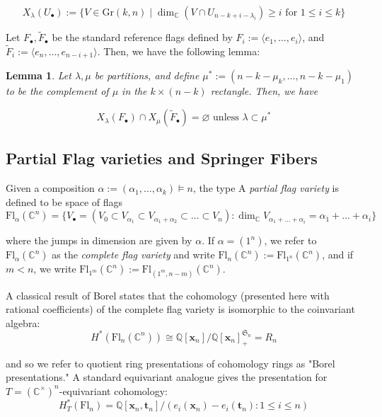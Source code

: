 \documentclass[11pt]{amsart}
\numberwithin{equation}{section}
\newtheorem{lemma}[theorem]{Lemma}
\theoremstyle{definition}
\newcommand{\symm}{{\mathfrak{S}}}
\newcommand{\Gr}{{\mathrm {Gr}}}
\newcommand{\CC}{{\mathbb{C}}}
\newcommand{\QQ}{{\mathbb{Q}}}
\newcommand{\xxx}{{\mathbf{x}}}
\newcommand{\ttt}{{\mathbf{t}}}
\newcommand{\Fl}{\text{Fl}}
\begin{document}
\[
X_\lambda(U_\bullet) := \{ V \in \Gr(k,n) \mid \dim_\CC(V \cap U_{n-k+i-\lambda_i}) \geq i \text{ for } 1 \leq i \leq k \}
\]

Let $F_\bullet, \widetilde{F}_\bullet$ be the standard reference flags defined by $F_i := \langle e_1,\dots,e_i \rangle$, and $\widetilde{F}_i := \langle e_n, \dots, e_{n-i+1} \rangle$. Then, we have the following lemma:

\begin{lemma}\label{lem: grass-intersect}
    Let $\lambda,\mu$ be partitions, and define $\mu^* := (n-k-\mu_k,\dots,n-k-\mu_1)$ to be the complement of $\mu$ in the $k \times (n-k)$ rectangle. Then, we have

    \[
X_\lambda(F_\bullet) \cap X_\mu(\widetilde{F}_\bullet) = \varnothing \text{ unless } \lambda \subset \mu^*
\]
\end{lemma}

\subsection{Partial Flag varieties and Springer Fibers}

Given a composition $\alpha := (\alpha_1,\dots,\alpha_k) \vDash n$, the type A \emph{partial flag variety} is defined to be space of flags
\[
\Fl_\alpha(\CC^n) = \{ V_\bullet = (V_0 \subset V_{\alpha_1} \subset V_{\alpha_1 + \alpha_2} \subset \dots \subset V_n) : \dim_\CC V_{\alpha_1 + \dots + \alpha_i} = \alpha_1 + \dots + \alpha_i\}
\]

where the jumps in dimension are given by $\alpha$. If $\alpha = (1^n)$, we refer to $\Fl_\alpha(\CC^n)$ as the \emph{complete flag variety} and write $\Fl_n(\CC^n) := \Fl_{1^n}(\CC^n)$, and if $m < n$, we write $\Fl_{1^m}(\CC^n) := \Fl_{(1^m,n-m)}(\CC^n)$.

A classical result of Borel states that the cohomology (presented here with rational coefficients) of the complete flag variety is isomorphic to the coinvariant algebra:
\[
H^*(\Fl_n(\CC^n)) \cong \QQ[\xxx_n]/\QQ[\xxx_n]^{\symm_n}_+ = R_n
\]

and so we refer to quotient ring presentations of cohomology rings as "Borel presentations." A standard equivariant analogue gives the presentation \cite[Chapter~4, Proposition~4.1]{AF} for $T = (\CC^\times)^n$-equivariant cohomology:
\[
H^*_T(\Fl_n) = \QQ[\xxx_n,\ttt_n]/(e_i(\xxx_n) - e_i(\ttt_n) : 1 \leq i \leq n)
\]
\end{document}
